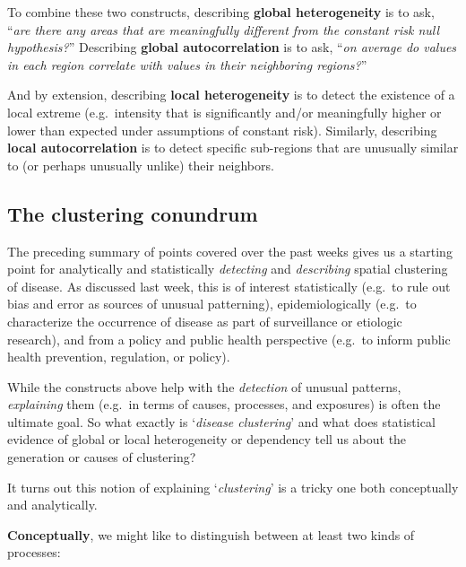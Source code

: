 \documentclass[
]{book}
\begin{document}
To combine these two constructs, describing \textbf{global heterogeneity} is to ask, ``\emph{are there any areas that are meaningfully different from the constant risk null hypothesis?}'' Describing \textbf{global autocorrelation} is to ask, ``\emph{on average do values in each region correlate with values in their neighboring regions?}''

And by extension, describing \textbf{local heterogeneity} is to detect the existence of a local extreme (e.g.~intensity that is significantly and/or meaningfully higher or lower than expected under assumptions of constant risk). Similarly, describing \textbf{local autocorrelation} is to detect specific sub-regions that are unusually similar to (or perhaps unusually unlike) their neighbors.

\hypertarget{the-clustering-conundrum}{%
\subsection{The clustering conundrum}\label{the-clustering-conundrum}}

The preceding summary of points covered over the past weeks gives us a starting point for analytically and statistically \emph{detecting} and \emph{describing} spatial clustering of disease. As discussed last week, this is of interest statistically (e.g.~to rule out bias and error as sources of unusual patterning), epidemiologically (e.g.~to characterize the occurrence of disease as part of surveillance or etiologic research), and from a policy and public health perspective (e.g.~to inform public health prevention, regulation, or policy).

While the constructs above help with the \emph{detection} of unusual patterns, \emph{explaining} them (e.g.~in terms of causes, processes, and exposures) is often the ultimate goal. So what exactly is `\emph{disease clustering}' and what does statistical evidence of global or local heterogeneity or dependency tell us about the generation or causes of clustering?

It turns out this notion of explaining `\emph{clustering}' is a tricky one both conceptually and analytically.

\textbf{Conceptually}, we might like to distinguish between at least two kinds of processes:
\end{document}
